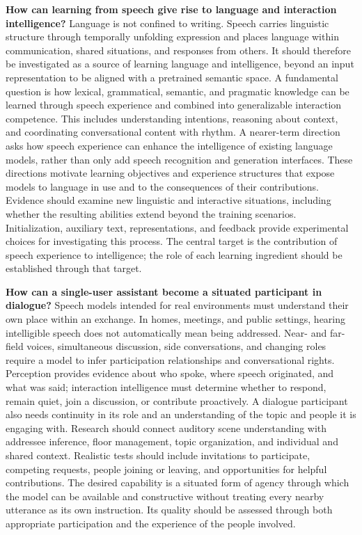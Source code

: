 \textbf{How can learning from speech give rise to language and interaction intelligence?} Language is not confined to writing. Speech carries linguistic structure through temporally unfolding expression and places language within communication, shared situations, and responses from others. It should therefore be investigated as a source of learning language and intelligence, beyond an input representation to be aligned with a pretrained semantic space. A fundamental question is how lexical, grammatical, semantic, and pragmatic knowledge can be learned through speech experience and combined into generalizable interaction competence. This includes understanding intentions, reasoning about context, and coordinating conversational content with rhythm. A nearer-term direction asks how speech experience can enhance the intelligence of existing language models, rather than only add speech recognition and generation interfaces. These directions motivate learning objectives and experience structures that expose models to language in use and to the consequences of their contributions. Evidence should examine new linguistic and interactive situations, including whether the resulting abilities extend beyond the training scenarios. Initialization, auxiliary text, representations, and feedback provide experimental choices for investigating this process. The central target is the contribution of speech experience to intelligence; the role of each learning ingredient should be established through that target.

\textbf{How can a single-user assistant become a situated participant in dialogue?} Speech models intended for real environments must understand their own place within an exchange. In homes, meetings, and public settings, hearing intelligible speech does not automatically mean being addressed. Near- and far-field voices, simultaneous discussion, side conversations, and changing roles require a model to infer participation relationships and conversational rights. Perception provides evidence about who spoke, where speech originated, and what was said; interaction intelligence must determine whether to respond, remain quiet, join a discussion, or contribute proactively. A dialogue participant also needs continuity in its role and an understanding of the topic and people it is engaging with. Research should connect auditory scene understanding with addressee inference, floor management, topic organization, and individual and shared context. Realistic tests should include invitations to participate, competing requests, people joining or leaving, and opportunities for helpful contributions. The desired capability is a situated form of agency through which the model can be available and constructive without treating every nearby utterance as its own instruction. Its quality should be assessed through both appropriate participation and the experience of the people involved.

